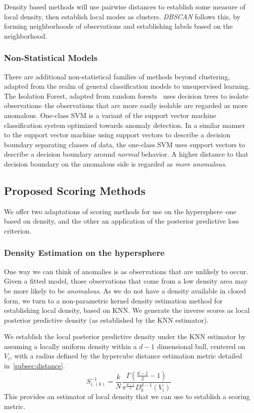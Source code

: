 Density based methods will use pairwise distances to establish some measure of local density, then
  establish local modes as clusters.  \emph{DBSCAN} \citep{ester1996} follows this, by forming
  neighborhoods of observations and establishing labels based on the neighborhood.

\subsubsection{Non-Statistical Models}
There are additional non-statistical families of methods beyond clustering, adapted from the realm
  of general classification models to unsupervised learning.  The Isolation Forest,\citep{liu2000}
  adapted from random forests~\citep{breiman2001} uses decision trees to isolate observations--the
  observations that are more easily isolable are regarded as more anomalous.  One-class SVM
  \citep{chang2011} is a variant of the support vector machine classification system optimized towards
  anomaly detection. In a similar manner to the support vector machine using support vectors to
  describe a decision boundary separating classes of data, the one-class SVM uses support vectors to
  describe a decision boundary around \emph{normal} behavior.  A higher distance to that decision
  boundary on the anomalous side is regarded as \emph{more anomalous}.

\subsection{Proposed Scoring Methods}
We offer two adaptations of scoring methods for use on the hypersphere--one based on density, and the
  other an application of the posterior predictive loss criterion.

\subsubsection{Density Estimation on the hypersphere}
One way we can think of anomalies is as observations that are unlikely to occur.  Given a fitted model,
  those observations that come from a low density area may be more likely to be \emph{anomalous}.
  As we do not have a density available in closed form, we turn to a non-parametric kernel density
  estimation method for establishing local density, based on KNN.  We generate the inverse scores as
  local posterior predictive density (as established by the KNN estimator).

We establish the local posterior predictive density under the KNN estimator by assuming a locally
  uniform density within a $d-1$ dimensional ball, centered on $V_i$, with a radius defined by
  the hypercube distance estimation metric detailed in~\ref{subsec:distance}.
  \begin{equation}
    \label{eqn:ad_knn}
      S_{i,(k)}^{-1} =
        \frac{k}{N}\frac{\Gamma\left(\frac{d-1}{2} - 1\right)}{\pi^{\frac{d-1}{2}}D_{k}^{d-1}(V_i)}
  \end{equation}
  This provides an estimator of local density that we can use to establish a scoring metric.

